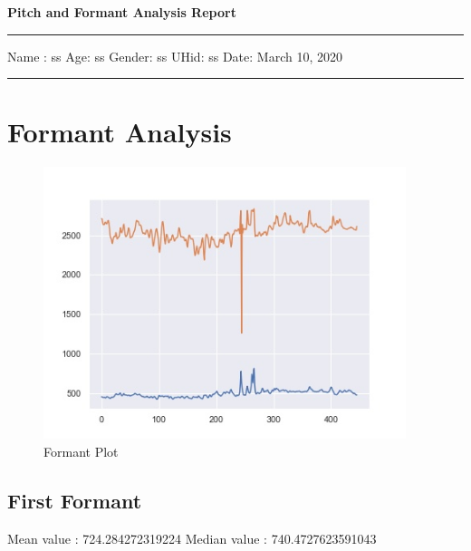 \documentclass{article}%
\begin{document}
%
\normalsize%
\begin{minipage}{\textwidth}%
\centering%
\begin{Large}%
\textbf{Pitch and Formant Analysis Report\newline%
}%
\end{Large}%
\noindent\rule{\textwidth}{1pt}%
\newline%
\linebreak%
\begin{minipage}{\textwidth}%
\flushleft%
Name : ss%
\newline%
Age: ss%
\newline%
Gender: ss%
\newline%
UHid: ss%
\newline%
Date: March 10, 2020%
\linebreak%
\noindent\rule{\textwidth}{1pt}%
\newline%
\end{minipage}%
\end{minipage}%
\section{Formant Analysis}%
\label{sec:FormantAnalysis}%


\begin{figure}[h!]%
\centering%
\includegraphics[width=400px]{media/formant.jpg}%
\caption{Formant Plot}%
\end{figure}

%
\subsection{First Formant}%
\label{subsec:FirstFormant}%
Mean value : 724.284272319224%
\newline%
Median value : 740.4727623591043

%
\end{document}
